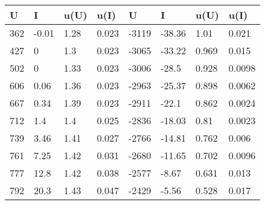 \begin{table}[H]\centering 
 \begin{tabular}{|l|l|l|l|l|l|l|l|}
\hline
 \rowcolor{lightgray} 
  U  &   I   &  u(U)  &  u(I)  &   U   &   I    &  u(U)  &  u(I)  \\ \hline

 362 & -0.01 &  1.28  & 0.023  & -3119 & -38.36 &  1.01  & 0.021  \\ \hline
 427 &   0   &  1.3   & 0.023  & -3065 & -33.22 & 0.969  & 0.015  \\ \hline
 502 &   0   &  1.33  & 0.023  & -3006 & -28.5  & 0.928  & 0.0098 \\ \hline
 606 & 0.06  &  1.36  & 0.023  & -2963 & -25.37 & 0.898  & 0.0062 \\ \hline
 667 & 0.34  &  1.39  & 0.023  & -2911 & -22.1  & 0.862  & 0.0024 \\ \hline
 712 &  1.4  &  1.4   & 0.025  & -2836 & -18.03 &  0.81  & 0.0023 \\ \hline
 739 & 3.46  &  1.41  & 0.027  & -2766 & -14.81 & 0.762  & 0.006  \\ \hline
 761 & 7.25  &  1.42  & 0.031  & -2680 & -11.65 & 0.702  & 0.0096 \\ \hline
 777 & 12.8  &  1.42  & 0.038  & -2577 & -8.67  & 0.631  & 0.013  \\ \hline
 792 & 20.3  &  1.43  & 0.047  & -2429 & -5.56  & 0.528  & 0.017  \\ \hline

\end{tabular}
\end{table}
